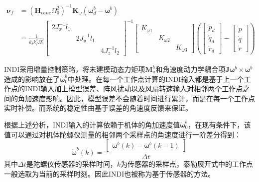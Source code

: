 \begin{equation}
    \begin{aligned}
        \boldsymbol{\nu}_f&=(\boldsymbol{H}_{vane}\Omega_0^2)^{-1}\boldsymbol{K}_{\omega}(\boldsymbol{\omega}_d^b-\boldsymbol{\omega}^b)\\
        &=\frac{1}{k_{\delta}k_f^2\Omega_0^2}
        \left[\begin{array}{ccc}2J_x^{-1}l_1 & & \\& 2J_y^{-1}l_1 & \\& & 4J_z^{-1}l_2\end{array}\right]^{-1}
        \left[\begin{array}{ccc}{K}_{\omega 1} & & \\& {K}_{\omega 2} & \\& & {K}_{\omega 3}\end{array}\right]
        \left (\begin{bmatrix}\dot{p}_d \\ \dot{q}_d \\ \dot{r}_d \end{bmatrix}-\begin{bmatrix}\dot{p} \\ \dot{q} \\ \dot{r}
        \end{bmatrix}\right )
    \end{aligned}
    \label{3-48}
\end{equation}

INDI采用增量控制策略，将未建模动态力矩项$\boldsymbol{M}_{a}^b$和角速度动力学耦合项$\boldsymbol{J}\boldsymbol{\omega}^b\times\boldsymbol{\omega}^b$造成的影响放在了$\dot {\boldsymbol{\omega}}_0^b$中处理。在每一个工作点计算的INDI输入都是基于上一个工作点的INDI输入加上模型误差、阵风扰动以及风扇转速输入对相邻两个工作点之间的角加速度影响。因此，模型误差不会随着时间进行累计，而是在每一个工作点实时补偿。而系统的稳定性由基于误差的角速度反馈来保证。

根据上述分析，INDI输入的计算依赖于机体的角加速度值$\dot {\boldsymbol{\omega}}_0^b$，在现有条件下，该值可以通过对机体陀螺仪测量的相邻两个采样点的角速度进行一阶差分得到：
\begin{equation}
    \dot{\boldsymbol{\omega}}^b(k)=\frac{
        \begin{bmatrix}
        \boldsymbol{\omega}^b(k)-\boldsymbol{\omega}^b(k-1)
        \end{bmatrix}}{\Delta t}
    \label{3-49}
\end{equation}
其中$\Delta t$是陀螺仪传感器的采样时间，$k$为传感器的采样点，泰勒展开式中的工作点一般选取为当前的采样时刻。因此INDI也被称为基于传感器的方法。

